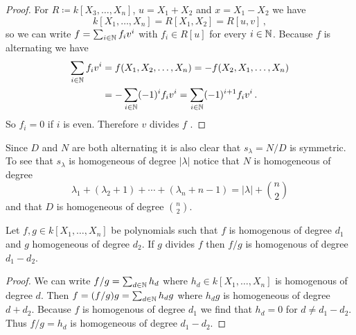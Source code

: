 \begin{example}[]
\begin{proof}
    For $R \coloneqq k[X_3, \dotsc, X_n]$, $u = X_1 + X_2$ and $x = X_1 - X_2$ we have
    \[
        k[X_1, \dotsc, X_n]
      = R[X_1, X_2]
      = R[u,v] \,,
    \]
    so we can write $f = \sum_{i \in \mathbb{N}} f_i v^i$ with $f_i \in R[u]$ for every $i \in \mathbb{N}$.
    Because $f$ is alternating we have
    \begin{align*}
           \sum_{i \in \mathbb{N}} f_i v^i
      &=   f(X_1, X_2, \dotsc, X_n)
       =  -f(X_2, X_1, \dotsc, X_n) \\
      &=  -\sum_{i \in \mathbb{N}} (-1)^i f_i v^i
       =   \sum_{i \in \mathbb{N}} (-1)^{i+1} f_i v^i \,.
    \end{align*}
    So $f_i = 0$ if $i$ is even.
    Therefore $v$ divides $f$ .
  \end{proof}
  Since $D$ and $N$ are both alternating it is also clear that $s_\lambda = N/D$ is symmetric.
  To see that $s_\lambda$ is homogeneous of degree $|\lambda|$ notice that $N$ is homogeneous of degree
  \[
      \lambda_1 + (\lambda_2 + 1) + \dotsb + (\lambda_n + n-1)
    = |\lambda| + \binom{n}{2}
  \]
  and that $D$ is homogeneous of degree $\binom{n}{2}$.
  \begin{claim}
    Let $f, g \in k[X_1, \dotsc, X_n]$ be polynomials such that $f$ is homogenous of degree $d_1$ and $g$ homogeneous of degree $d_2$.
    If $g$ divides $f$ then $f/g$ is homogenous of degree $d_1 - d_2$.
  \end{claim}
  \begin{proof}
    We can write $f/g = \sum_{d \in \mathbb{N}} h_d$ where $h_d \in k[X_1, \dotsc, X_n]$ is homogenous of degree $d$.
    Then $f = (f/g)g = \sum_{d \in \mathbb{N}} h_d g$ where $h_d g$ is homogeneous of degree $d + d_2$.
    Because $f$ is homogenous of degree $d_1$ we find that $h_d = 0$ for $d \neq d_1 - d_2$.
    Thus $f/g = h_d$ is homogeneous of degree $d_1 - d_2$.
  \end{proof}
\end{example}


